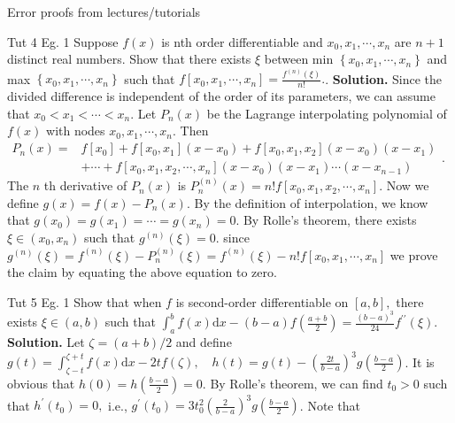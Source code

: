 \documentclass[10pt,landscape]{article}
\theoremstyle{definition}
\newcommand{\thistheoremname}{}
\newtheorem*{genericthm*}{\thistheoremname}
\newenvironment{namedthm*}[1]
{\renewcommand{\thistheoremname}{#1}\begin{genericthm*}}
{\end{genericthm*}}
\begin{document}
\begin{multicols}{3}
\begin{namedthm*}{Error proofs from lectures/tutorials}
		\begin{namedthm*}{Tut 4 Eg. 1}
			Suppose \(f(x)\) is nth order differentiable and \(x_{0}, x_{1}, \cdots, x_{n}\) are \(n+1\) distinct real
			numbers. Show that there exists \(\xi\) between min \(\left\{x_{0}, x_{1}, \cdots, x_{n}\right\}\) and max \(\left\{x_{0}, x_{1}, \cdots, x_{n}\right\}\) such
			that
			\(
			f\left[x_{0}, x_{1}, \cdots, x_{n}\right]=\frac{f^{(n)}(\xi)}{n !}.
			\). \textbf{Solution.} Since the divided difference is independent of the order of its parameters, we can
			assume that \(x_{0}<x_{1}<\cdots<x_{n} .\) Let \(P_{n}(x)\) be the Lagrange interpolating polynomial of \(f(x)\)
			with nodes \(x_{0}, x_{1}, \cdots, x_{n} .\) Then \(\begin{aligned} P_{n}(x)=& f\left[x_{0}\right]+f\left[x_{0}, x_{1}\right]\left(x-x_{0}\right)+f\left[x_{0}, x_{1}, x_{2}\right]\left(x-x_{0}\right)\left(x-x_{1}\right) \\ &+\cdots+f\left[x_{0}, x_{1}, x_{2}, \cdots, x_{n}\right]\left(x-x_{0}\right)\left(x-x_{1}\right) \cdots\left(x-x_{n-1}\right) \end{aligned}\). The \(n\) th derivative of \(P_{n}(x)\) is
			\(
			P_{n}^{(n)}(x)=n ! f\left[x_{0}, x_{1}, x_{2}, \cdots, x_{n}\right]
			\). Now we define
			\(
			g(x)=f(x)-P_{n}(x).
			\) By the definition of interpolation, we know that
			\(
			g\left(x_{0}\right)=g\left(x_{1}\right)=\cdots=g\left(x_{n}\right)=0
			\). By Rolle's theorem, there exists \(\xi \in\left(x_{0}, x_{n}\right)\) such that \(g^{(n)}(\xi)=0 .\) since
			\(
			g^{(n)}(\xi)=f^{(n)}(\xi)-P_{n}^{(n)}(\xi)=f^{(n)}(\xi)-n ! f\left[x_{0}, x_{1}, \cdots, x_{n}\right]
			\)
			we prove the claim by equating the above equation to zero.
		\end{namedthm*}
		\begin{namedthm*}{Tut 5 Eg. 1}
			Show that when \(f\) is second-order differentiable on \([a, b],\) there exists \(\xi \in(a, b)\)
			such that
			\(
			\int_{a}^{b} f(x) \mathrm{d} x-(b-a) f\left(\frac{a+b}{2}\right)=\frac{(b-a)^{3}}{24} f^{\prime \prime}(\xi).
			\) \textbf{Solution.} Let \(\zeta=(a+b) / 2\) and define
			\(
			g(t)=\int_{\zeta-t}^{\zeta+t} f(x) \mathrm{d} x-2 t f(\zeta), \quad h(t)=g(t)-\left(\frac{2 t}{b-a}\right)^{3} g\left(\frac{b-a}{2}\right)
			\). It is obvious that
			\(
			h(0)=h\left(\frac{b-a}{2}\right)=0
			\). By Rolle's theorem, we can find \(t_{0}>0\) such that \(h^{\prime}\left(t_{0}\right)=0,\) i.e.,
			\(
			g^{\prime}\left(t_{0}\right)=3 t_{0}^{2}\left(\frac{2}{b-a}\right)^{3} g\left(\frac{b-a}{2}\right)
			\). Note that

\end{namedthm*}
\end{namedthm*}
\end{multicols}
\end{document}
